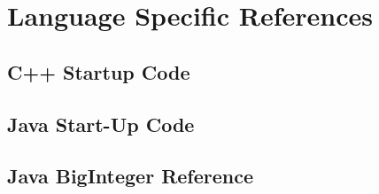 
\chapter{Language Specific References}
\chapterinfo{}
	\section{C++ Startup Code}
	
	

	
	\section{Java Start-Up Code}
	
	
	
	\section{Java BigInteger Reference}
	
	
